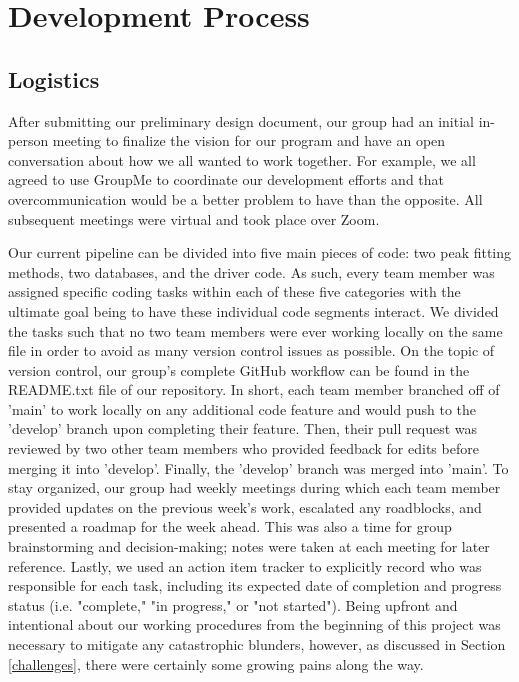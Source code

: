 \documentclass{dhbenelux}
\begin{document}
\section{Development Process} \label{dev_process}

\subsection{Logistics}
After submitting our preliminary design document, our group had an initial in-person meeting to finalize the vision for our program and have an open conversation about how we all wanted to work together. For example, we all agreed to use GroupMe to coordinate our development efforts and that overcommunication would be a better problem to have than the opposite. All subsequent meetings were virtual and took place over Zoom. 

Our current pipeline can be divided into five main pieces of code: two peak fitting methods, two databases, and the driver code. As such, every team member was assigned specific coding tasks within each of these five categories with the ultimate goal being to have these individual code segments interact. We divided the tasks such that no two team members were ever working locally on the same file in order to avoid as many version control issues as possible. On the topic of version control, our group's complete GitHub workflow can be found in the README.txt file of our repository. In short, each team member branched off of 'main' to work locally on any additional code feature and would push to the 'develop' branch upon completing their feature. Then, their pull request was reviewed by two other team members who provided feedback for edits before merging it into 'develop'. Finally, the 'develop' branch was merged into 'main'. To stay organized, our group had weekly meetings during which each team member provided updates on the previous week's work, escalated any roadblocks, and presented a roadmap for the week ahead. This was also a time for group brainstorming and decision-making; notes were taken at each meeting for later reference. Lastly, we used an action item tracker to explicitly record who was responsible for each task, including its expected date of completion and progress status (i.e. "complete," "in progress," or "not started"). Being upfront and intentional about our working procedures from the beginning of this project was necessary to mitigate any catastrophic blunders, however, as discussed in Section \ref{challenges}, there were certainly some growing pains along the way.     
\end{document}
